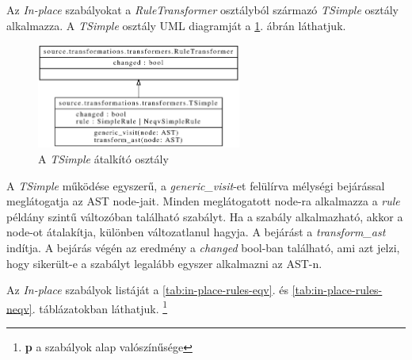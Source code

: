Az \emph{In-place} szabályokat
a \emph{RuleTransformer} osztályból származó \emph{TSimple} osztály alkalmazza.
A \emph{TSimple} osztály UML diagramját a \ref{fig:TSimple}. ábrán láthatjuk.

\begin{figure}[H]
	\centering
	\includegraphics[width=0.6\textwidth]{images/uml/TSimple.eps}
	\caption{A \emph{TSimple} átalkító osztály}
	\label{fig:TSimple}
\end{figure}

A \emph{TSimple} működése egyszerű,
a \emph{generic\_visit}-et felülírva mélységi bejárással meglátogatja az AST node-jait.
Minden meglátogatott node-ra alkalmazza
a \emph{rule} példány szintű változóban található szabályt.
Ha a szabály alkalmazható, akkor a node-ot átalakítja, különben változatlanul hagyja.
A bejárást a \emph{transform\_ast} indítja.
A bejárás végén az eredmény a \emph{changed} bool-ban található,
ami azt jelzi, hogy sikerült-e a szabályt legalább egyszer alkalmazni az AST-n.

Az \emph{In-place} szabályok listáját a \ref{tab:in-place-rules-eqv}. és \ref{tab:in-place-rules-neqv}.
táblázatokban láthatjuk.
\footnote{\textbf{p} a szabályok alap valószínűsége}

